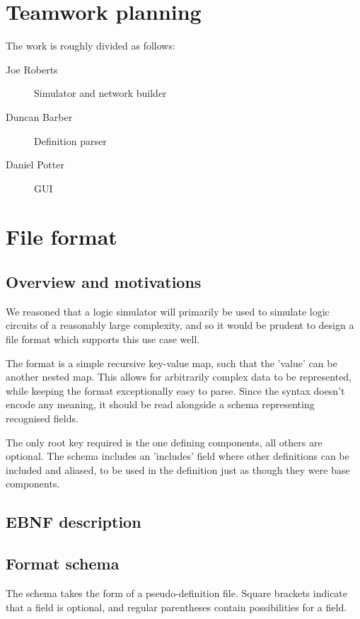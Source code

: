 \documentclass[a4paper]{article}
\begin{document}
\section{Teamwork planning}
    The work is roughly divided as follows:
    \begin{description}
        \item[Joe Roberts] Simulator and network builder
        \item[Duncan Barber] Definition parser
        \item[Daniel Potter] GUI
    \end{description}

\section{File format}
    \subsection{Overview and motivations}
        We reasoned that a logic simulator will primarily be used to simulate logic circuits of a reasonably large complexity, and so it would be prudent to design a file format which supports this use case well.

        The format is a simple recursive key-value map, such that the 'value' can be another nested map. This allows for arbitrarily complex data to be represented, while keeping the format exceptionally easy to parse. Since the syntax doesn't encode any meaning, it should be read alongside a schema representing recognised fields.

        The only root key required is the one defining components, all others are optional. The schema includes an 'includes' field where other definitions can be included and aliased, to be used in the definition just as though they were base components.

    \subsection{EBNF description}
    

    \subsection{Format schema}
    The schema takes the form of a pseudo-definition file. Square brackets indicate that a field is optional, and regular parentheses contain possibilities for a field.
    
\end{document}
